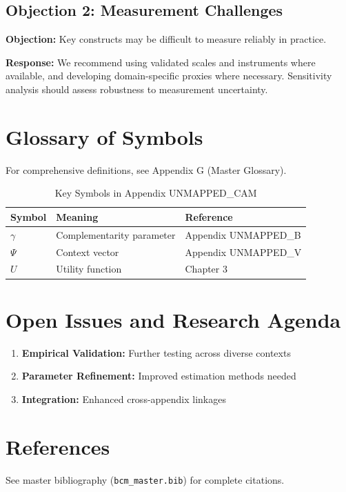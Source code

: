 \subsection{Objection 2: Measurement Challenges}

\textbf{Objection:} Key constructs may be difficult to measure reliably in
practice.

\textbf{Response:} We recommend using validated scales and instruments where
available, and developing domain-specific proxies where necessary. Sensitivity
analysis should assess robustness to measurement uncertainty.



\section{Glossary of Symbols}
\label{sec:cam-glossary}

For comprehensive definitions, see Appendix G (Master Glossary).

\begin{table}[htbp]
\centering
\caption{Key Symbols in Appendix UNMAPPED_CAM}
\begin{tabular}{lll}
\toprule
\textbf{Symbol} & \textbf{Meaning} & \textbf{Reference} \\
\midrule
$\gamma$ & Complementarity parameter & Appendix UNMAPPED_B \\
$\Psi$ & Context vector & Appendix UNMAPPED_V \\
$U$ & Utility function & Chapter 3 \\
\bottomrule
\end{tabular}
\end{table}



\section{Open Issues and Research Agenda}
\label{sec:cam-open}

\begin{enumerate}
    \item \textbf{Empirical Validation:} Further testing across diverse contexts
    \item \textbf{Parameter Refinement:} Improved estimation methods needed
    \item \textbf{Integration:} Enhanced cross-appendix linkages
\end{enumerate}

\section{References}
\label{sec:cam-references}

See master bibliography (\texttt{bcm\_master.bib}) for complete citations.

\nocite{bcm_master}

